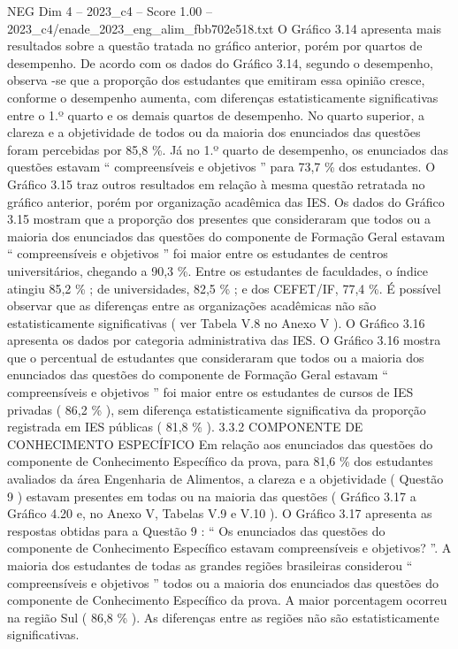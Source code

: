 \begin{textsample}{NEG Dim 4 – 2023\_c4 – Score 1.00 – 2023\_c4/enade\_2023\_eng\_alim\_fbb702e518.txt}
O Gráfico 3.14 apresenta mais resultados sobre a questão tratada no gráfico anterior, porém por quartos de desempenho.
De acordo com os dados do Gráfico 3.14, segundo o desempenho, observa -se que a proporção dos estudantes que emitiram essa opinião cresce, conforme o desempenho aumenta, com diferenças estatisticamente significativas entre o 1.º quarto e os demais quartos de desempenho.
No quarto superior, a clareza e a objetividade de todos ou da maioria dos enunciados das questões foram percebidas por 85,8 \%.
Já no 1.º quarto de desempenho, os enunciados das questões estavam “ compreensíveis e objetivos ” para 73,7 \% dos estudantes.
O Gráfico 3.15 traz outros resultados em relação à mesma questão retratada no gráfico anterior, porém por organização acadêmica das IES.
Os dados do Gráfico 3.15 mostram que a proporção dos presentes que consideraram que todos ou a maioria dos enunciados das questões do componente de Formação Geral estavam “ compreensíveis e objetivos ” foi maior entre os estudantes de centros universitários, chegando a 90,3 \%.
Entre os estudantes de faculdades, o índice atingiu 85,2 \% ; de universidades, 82,5 \% ; e dos CEFET/IF, 77,4 \%.
É possível observar que as diferenças entre as organizações acadêmicas não são estatisticamente significativas ( ver Tabela V.8 no Anexo V ).
O Gráfico 3.16 apresenta os dados por categoria administrativa das IES.
O Gráfico 3.16 mostra que o percentual de estudantes que consideraram que todos ou a maioria dos enunciados das questões do componente de Formação Geral estavam “ compreensíveis e objetivos ” foi maior entre os estudantes de cursos de IES privadas ( 86,2 \% ), sem diferença estatisticamente significativa da proporção registrada em IES públicas ( 81,8 \% ). 3.3.2 COMPONENTE DE CONHECIMENTO ESPECÍFICO Em relação aos enunciados das questões do componente de Conhecimento Específico da prova, para 81,6 \% dos estudantes avaliados da área Engenharia de Alimentos, a clareza e a objetividade ( Questão 9 ) estavam presentes em todas ou na maioria das questões ( Gráfico 3.17 a Gráfico 4.20 e, no Anexo V, Tabelas V.9 e V.10 ).
O Gráfico 3.17 apresenta as respostas obtidas para a Questão 9 : “ Os enunciados das questões do componente de Conhecimento Específico estavam compreensíveis e objetivos? ”.
A maioria dos estudantes de todas as grandes regiões brasileiras considerou “ compreensíveis e objetivos ” todos ou a maioria dos enunciados das questões do componente de Conhecimento Específico da prova.
A maior porcentagem ocorreu na região Sul ( 86,8 \% ).
As diferenças entre as regiões não são estatisticamente significativas.

\end{textsample}
